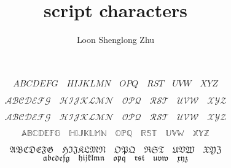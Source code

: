 \documentclass{article}
\title{script characters}
\author{Loon Shenglong Zhu}
\begin{document}
\maketitle 

\[ABCDEFG\quad HIJKLMN\quad OPQ\quad RST\quad UVW\quad XYZ\]

\[\mathcal{ABCDEFG}\quad \mathcal{HIJKLMN}\quad \mathcal{OPQ}\quad \mathcal{RST}\quad \mathcal{UVW}\quad \mathcal{XYZ}\]

\[\mathscr{ABCDEFG}\quad \mathscr{HIJKLMN}\quad \mathscr{OPQ}\quad \mathscr{RST}\quad \mathscr{UVW}\quad \mathscr{XYZ}\]


\[\mathbb{ABCDEFG}\quad \mathbb{HIJKLMN}\quad \mathbb{OPQ}\quad \mathbb{RST}\quad \mathbb{UVW}\quad \mathbb{XYZ}\]

\[\mathfrak{ABCDEFG}\quad \mathfrak{HIJKLMN}\quad \mathfrak{OPQ}\quad \mathfrak{RST}\quad \mathfrak{UVW}\quad \mathfrak{XYZ}\]
\[\mathfrak{abcdefg}\quad \mathfrak{hijklmn}\quad \mathfrak{opq}\quad \mathfrak{rst}\quad \mathfrak{uvw}\quad \mathfrak{xyz}\]
\end{document}
